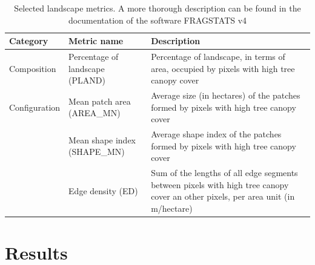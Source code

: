 \documentclass[12pt]{iopart}
\begin{document}
\begin{table}[!h]
  \footnotesize %
  \caption{\label{tab:selected-metrics}Selected landscape metrics. A more thorough description can be found in the documentation of the software FRAGSTATS v4 \cite{mcgarigal2012fragstats}}
  \renewcommand{\arraystretch}{1.5} %
  \begin{center}
  \begin{tabular}{p{} p{} p{}} 
    \toprule
    \textbf{Category} & \textbf{Metric name} & \textbf{Description} \\
    \midrule
    Composition & Percentage of landscape (PLAND) & Percentage of landscape, in terms of area, occupied by pixels with high tree canopy cover \\
    Configuration & Mean patch area (AREA\_MN) & Average size (in hectares) of the patches formed by pixels with high tree canopy cover \\
    & Mean shape index (SHAPE\_MN) & Average shape index of the patches formed by pixels with high tree canopy cover \\
    & Edge density (ED) & Sum of the lengths of all edge segments between pixels with high tree canopy cover an other pixels, per area unit (in m/hectare) \\    
    \bottomrule  
  \end{tabular}
  \end{center}
\end{table}


\section{Results}




\end{document}
